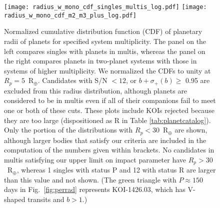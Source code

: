 \documentclass{aastex62}
\begin{document}

\begin{figure}
    \centering
    \texttt{[image: radius\_w\_mono\_cdf\_singles\_multis\_log.pdf]}
    \texttt{[image: radius\_w\_mono\_cdf\_m2\_m3\_plus\_log.pdf]}
    \caption{Normalized cumulative distribution function (CDF) of planetary radii of planets for specified system multiplicity. {The panel on the left compares singles with planets in multis, whereas the panel on the right compares planets in two-planet systems with those in systems of higher multiplicity.} We normalized the CDFs to unity at $R_p = 5$~R$_{\oplus}$. Candidates with S/N $< 12$, or $b + \sigma_+(b) \geq$ 0.95 are excluded from this radius distribution, although planets are considered to be in multis even if all of their companions fail to meet one or both of these cuts. These plots include KOIs rejected because they are too large (dispositioned as R in Table \ref{tab:planetcatalog}). Only the portion of the distributions with  $R_p < 30$~R$_{\oplus}$ are shown, although larger bodies that satisfy our criteria are included in the computation of the numbers given within brackets. No candidates in multis satisfying our upper limit on impact parameter have $R_p > 30$~R$_{\oplus}$, whereas 1 singles with status P and 12 with status R are larger than this value and not shown. (The green triangle with $P\approx150$ days in Fig.~\ref{fig:perrad} represents KOI-1426.03, which has V-shaped transits and $b>1$.)%
    \label{fig:radius_multis_singles}}
\end{figure}%
\end{document}
